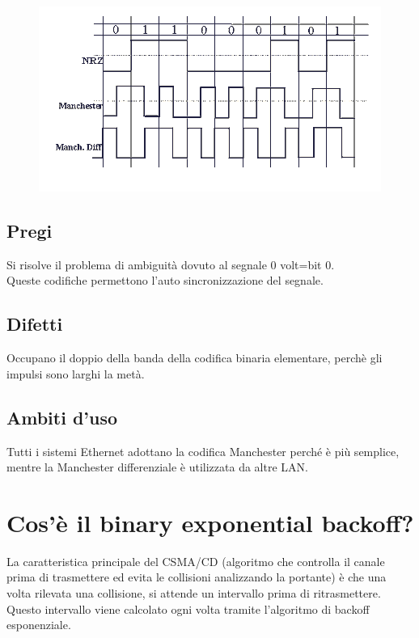 \begin{figure}[H]
\centering
\includegraphics[scale=0.8]{res/img/28_CodificaManchester.png}
\end{figure}

\subsection{Pregi}
Si risolve il problema di ambiguità dovuto al segnale 0 volt=bit 0.\\
Queste codifiche permettono l'auto sincronizzazione del segnale.

\subsection{Difetti}
Occupano il doppio della banda della codifica binaria elementare, perchè gli impulsi sono larghi la metà.

\subsection{Ambiti d'uso}
Tutti i sistemi Ethernet adottano la codifica Manchester perché è più semplice, mentre la Manchester differenziale è utilizzata da altre LAN.

\section{Cos'è il binary exponential backoff?}
La caratteristica principale del CSMA/CD (algoritmo che controlla il canale prima di trasmettere ed evita le collisioni analizzando la portante) è che una volta rilevata una collisione, si attende un intervallo prima di ritrasmettere. Questo intervallo viene calcolato ogni volta tramite l'algoritmo di backoff esponenziale.

